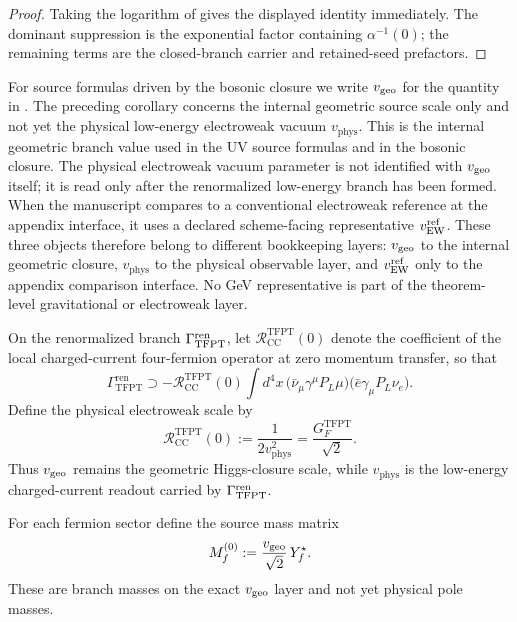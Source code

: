 \begin{proof}
Taking the logarithm of  gives the displayed identity immediately. The
dominant suppression is the exponential factor containing $\alpha^{-1}(0)$; the remaining terms are
the closed-branch carrier and retained-seed prefactors.
\end{proof}

\begin{remark}
For source formulas driven by the bosonic closure we write $v_{\mathrm{geo}}$ for the quantity in
. The preceding corollary concerns the internal geometric source scale
only and not yet the physical low-energy electroweak vacuum $v_{\mathrm{phys}}$. This is the
internal geometric branch value used in the UV source formulas and in the bosonic closure. The
physical electroweak vacuum parameter is not identified with $v_{\mathrm{geo}}$ itself; it is read only after
the renormalized low-energy branch has been formed. When the manuscript compares to a conventional
electroweak reference at the appendix interface, it uses a declared scheme-facing representative
$v_{\mathrm{EW}}^{\mathrm{ref}}$. These three objects therefore belong to different
bookkeeping layers: $v_{\mathrm{geo}}$ to the internal geometric closure, $v_{\mathrm{phys}}$ to the physical
observable layer, and $v_{\mathrm{EW}}^{\mathrm{ref}}$ only to the appendix comparison interface. No GeV representative is
part of the theorem-level gravitational or electroweak layer.
\end{remark}

\begin{definition}
\label{def:physical-ew-scale}
On the renormalized branch $\Gamma_{\mathrm{TFPT}}^{\mathrm{ren}}$, let $\mathcal R_{\mathrm{CC}}^{\mathrm{TFPT}}(0)$ denote the
coefficient of the local charged-current four-fermion operator at zero momentum transfer, so that
\[
\Gamma_{\mathrm{TFPT}}^{\mathrm{ren}}
\supset
-\mathcal R_{\mathrm{CC}}^{\mathrm{TFPT}}(0)
\int d^4x\,
\bigl(\bar\nu_\mu\gamma^\mu P_L\mu\bigr)\bigl(\bar e\gamma_\mu P_L\nu_e\bigr).
\]
Define the physical electroweak scale by
\[
\mathcal R_{\mathrm{CC}}^{\mathrm{TFPT}}(0)
:=
\frac{1}{2v_{\mathrm{phys}}^2}
=
\frac{G_F^{\mathrm{TFPT}}}{\sqrt2}.
\]
Thus $v_{\mathrm{geo}}$ remains the geometric Higgs-closure scale, while $v_{\mathrm{phys}}$ is the low-energy
charged-current readout carried by $\Gamma_{\mathrm{TFPT}}^{\mathrm{ren}}$.
\end{definition}

\begin{definition}
\label{def:branch-source-masses}
For each fermion sector define the source mass matrix
\[
M_f^{(0)}:=\frac{v_{\mathrm{geo}}}{\sqrt2}\,Y_f^\star.
\]
These are branch masses on the exact $v_{\mathrm{geo}}$ layer and not yet physical pole masses.
\end{definition}

